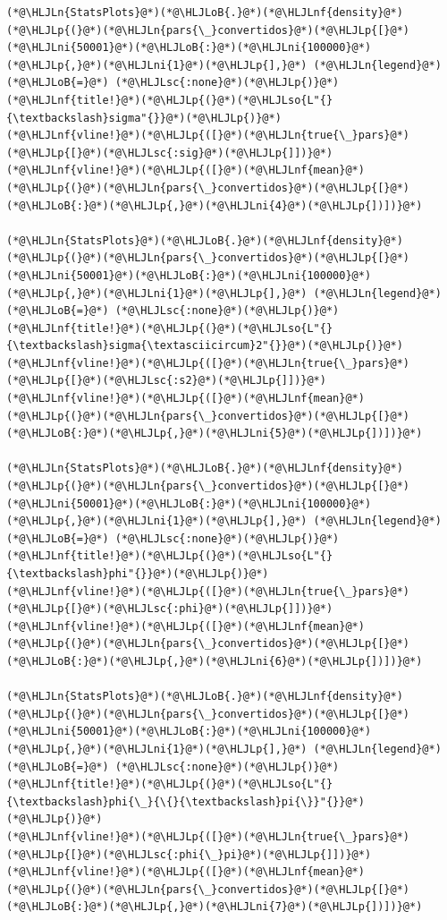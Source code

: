 \documentclass[12pt,a4paper]{article}
\newcommand{\HLJLn}[1]{#1}
\newcommand{\HLJLnf}[1]{\textcolor[RGB]{66,102,213}{#1}}
\newcommand{\HLJLsc}[1]{\textcolor[RGB]{201,61,57}{#1}}
\newcommand{\HLJLso}[1]{\textcolor[RGB]{201,61,57}{#1}}
\newcommand{\HLJLni}[1]{\textcolor[RGB]{59,151,46}{#1}}
\newcommand{\HLJLoB}[1]{\textcolor[RGB]{102,102,102}{\textbf{#1}}}
\newcommand{\HLJLp}[1]{#1}
\begin{document}
\begin{lstlisting}
(*@\HLJLn{StatsPlots}@*)(*@\HLJLoB{.}@*)(*@\HLJLnf{density}@*)(*@\HLJLp{(}@*)(*@\HLJLn{pars{\_}convertidos}@*)(*@\HLJLp{[}@*)(*@\HLJLni{50001}@*)(*@\HLJLoB{:}@*)(*@\HLJLni{100000}@*)(*@\HLJLp{,}@*)(*@\HLJLni{1}@*)(*@\HLJLp{],}@*) (*@\HLJLn{legend}@*) (*@\HLJLoB{=}@*) (*@\HLJLsc{:none}@*)(*@\HLJLp{)}@*)
(*@\HLJLnf{title!}@*)(*@\HLJLp{(}@*)(*@\HLJLso{L"{}{\textbackslash}sigma"{}}@*)(*@\HLJLp{)}@*)
(*@\HLJLnf{vline!}@*)(*@\HLJLp{([}@*)(*@\HLJLn{true{\_}pars}@*)(*@\HLJLp{[}@*)(*@\HLJLsc{:sig}@*)(*@\HLJLp{]])}@*)
(*@\HLJLnf{vline!}@*)(*@\HLJLp{([}@*)(*@\HLJLnf{mean}@*)(*@\HLJLp{(}@*)(*@\HLJLn{pars{\_}convertidos}@*)(*@\HLJLp{[}@*)(*@\HLJLoB{:}@*)(*@\HLJLp{,}@*)(*@\HLJLni{4}@*)(*@\HLJLp{])])}@*)

(*@\HLJLn{StatsPlots}@*)(*@\HLJLoB{.}@*)(*@\HLJLnf{density}@*)(*@\HLJLp{(}@*)(*@\HLJLn{pars{\_}convertidos}@*)(*@\HLJLp{[}@*)(*@\HLJLni{50001}@*)(*@\HLJLoB{:}@*)(*@\HLJLni{100000}@*)(*@\HLJLp{,}@*)(*@\HLJLni{1}@*)(*@\HLJLp{],}@*) (*@\HLJLn{legend}@*) (*@\HLJLoB{=}@*) (*@\HLJLsc{:none}@*)(*@\HLJLp{)}@*)
(*@\HLJLnf{title!}@*)(*@\HLJLp{(}@*)(*@\HLJLso{L"{}{\textbackslash}sigma{\textasciicircum}2"{}}@*)(*@\HLJLp{)}@*)
(*@\HLJLnf{vline!}@*)(*@\HLJLp{([}@*)(*@\HLJLn{true{\_}pars}@*)(*@\HLJLp{[}@*)(*@\HLJLsc{:s2}@*)(*@\HLJLp{]])}@*)
(*@\HLJLnf{vline!}@*)(*@\HLJLp{([}@*)(*@\HLJLnf{mean}@*)(*@\HLJLp{(}@*)(*@\HLJLn{pars{\_}convertidos}@*)(*@\HLJLp{[}@*)(*@\HLJLoB{:}@*)(*@\HLJLp{,}@*)(*@\HLJLni{5}@*)(*@\HLJLp{])])}@*)

(*@\HLJLn{StatsPlots}@*)(*@\HLJLoB{.}@*)(*@\HLJLnf{density}@*)(*@\HLJLp{(}@*)(*@\HLJLn{pars{\_}convertidos}@*)(*@\HLJLp{[}@*)(*@\HLJLni{50001}@*)(*@\HLJLoB{:}@*)(*@\HLJLni{100000}@*)(*@\HLJLp{,}@*)(*@\HLJLni{1}@*)(*@\HLJLp{],}@*) (*@\HLJLn{legend}@*) (*@\HLJLoB{=}@*) (*@\HLJLsc{:none}@*)(*@\HLJLp{)}@*)
(*@\HLJLnf{title!}@*)(*@\HLJLp{(}@*)(*@\HLJLso{L"{}{\textbackslash}phi"{}}@*)(*@\HLJLp{)}@*)
(*@\HLJLnf{vline!}@*)(*@\HLJLp{([}@*)(*@\HLJLn{true{\_}pars}@*)(*@\HLJLp{[}@*)(*@\HLJLsc{:phi}@*)(*@\HLJLp{]])}@*)
(*@\HLJLnf{vline!}@*)(*@\HLJLp{([}@*)(*@\HLJLnf{mean}@*)(*@\HLJLp{(}@*)(*@\HLJLn{pars{\_}convertidos}@*)(*@\HLJLp{[}@*)(*@\HLJLoB{:}@*)(*@\HLJLp{,}@*)(*@\HLJLni{6}@*)(*@\HLJLp{])])}@*)

(*@\HLJLn{StatsPlots}@*)(*@\HLJLoB{.}@*)(*@\HLJLnf{density}@*)(*@\HLJLp{(}@*)(*@\HLJLn{pars{\_}convertidos}@*)(*@\HLJLp{[}@*)(*@\HLJLni{50001}@*)(*@\HLJLoB{:}@*)(*@\HLJLni{100000}@*)(*@\HLJLp{,}@*)(*@\HLJLni{1}@*)(*@\HLJLp{],}@*) (*@\HLJLn{legend}@*) (*@\HLJLoB{=}@*) (*@\HLJLsc{:none}@*)(*@\HLJLp{)}@*)
(*@\HLJLnf{title!}@*)(*@\HLJLp{(}@*)(*@\HLJLso{L"{}{\textbackslash}phi{\_}{\{}{\textbackslash}pi{\}}"{}}@*)(*@\HLJLp{)}@*)
(*@\HLJLnf{vline!}@*)(*@\HLJLp{([}@*)(*@\HLJLn{true{\_}pars}@*)(*@\HLJLp{[}@*)(*@\HLJLsc{:phi{\_}pi}@*)(*@\HLJLp{]])}@*)
(*@\HLJLnf{vline!}@*)(*@\HLJLp{([}@*)(*@\HLJLnf{mean}@*)(*@\HLJLp{(}@*)(*@\HLJLn{pars{\_}convertidos}@*)(*@\HLJLp{[}@*)(*@\HLJLoB{:}@*)(*@\HLJLp{,}@*)(*@\HLJLni{7}@*)(*@\HLJLp{])])}@*)


\end{lstlisting}
\end{document}
